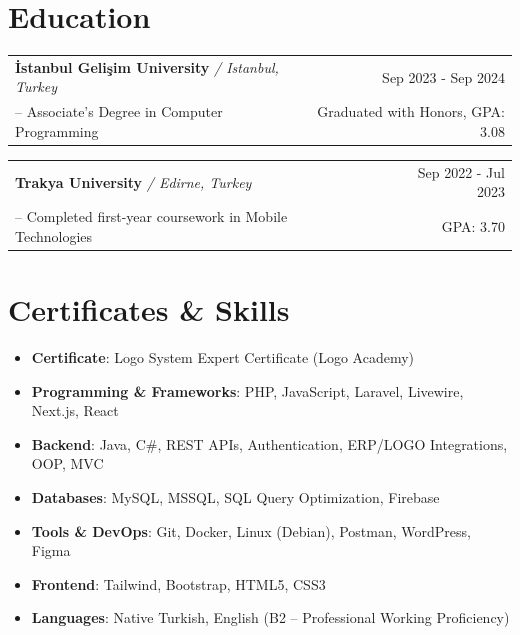 \documentclass[a4paper,12pt]{article}
\makeatletter
\newenvironment{educationshort}[5]
    {
    \begin{tabularx}{\linewidth}{@{}l X r@{}}
    \textbf{#1} {\small\textit{/ #2}} & \hfill & #3 \\[3.5pt]
    -- #4 & \hfill & #5 \\[3pt]
    \end{tabularx}
    }
    {
    }
\makeatother
\begin{document}
\section{Education}

\begin{educationshort}
{İstanbul Gelişim University}{Istanbul, Turkey}{Sep 2023 - Sep 2024}
{Associate’s Degree in Computer Programming}{Graduated with Honors, GPA: 3.08}
\end{educationshort}

\begin{educationshort}
{Trakya University}{Edirne, Turkey}{Sep 2022 - Jul 2023}
{Completed first-year coursework in Mobile Technologies}{GPA: 3.70}
\end{educationshort}
\vspace{-8pt}

\section{Certificates \& Skills}

\begin{itemize}[nosep,after=\strut, leftmargin=1em, itemsep=2.5pt,label=\textbullet]
    \item \textbf{Certificate}: Logo System Expert Certificate (Logo Academy)
    \item \textbf{Programming \& Frameworks}: PHP, JavaScript, Laravel, Livewire, Next.js, React
    \item \textbf{Backend}: Java, C\#, REST APIs, Authentication, ERP/LOGO Integrations, OOP, MVC
    \item \textbf{Databases}: MySQL, MSSQL, SQL Query Optimization, Firebase
    \item \textbf{Tools \& DevOps}: Git, Docker, Linux (Debian), Postman, WordPress, Figma
    \item \textbf{Frontend}: Tailwind, Bootstrap, HTML5, CSS3
    \item \textbf{Languages}: Native Turkish, English (B2 – Professional Working Proficiency)
\end{itemize}

\vfill
\end{document}
